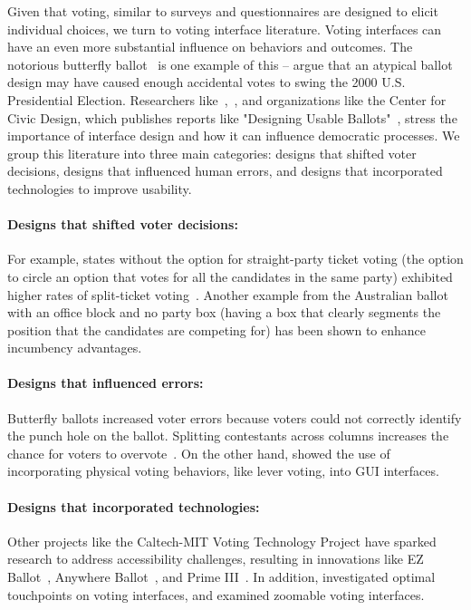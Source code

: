 Given that voting, similar to surveys and questionnaires are designed to elicit individual choices, we turn to voting interface literature. Voting interfaces can have an even more substantial influence on behaviors and outcomes. The notorious butterfly ballot~\cite{wandButterflyDidIt2001} is one example of this -- \textcite{wandButterflyDidIt2001} argue that an atypical ballot design may have caused enough accidental votes to swing the 2000 U.S. Presidential Election. Researchers like~\textcite{engstrom2020politics},~\textcite{chisnellDemocracyDesignProblem2016}, and organizations like the Center for Civic Design, which publishes reports like "Designing Usable Ballots"~\cite{DesigningUsableBallots2015}, stress the importance of interface design and how it can influence democratic processes. We group this literature into three main categories: designs that shifted voter decisions, designs that influenced human errors, and designs that incorporated technologies to improve usability.

\paragraph{Designs that shifted voter decisions: } For example, states without the option for straight-party ticket voting (the option to circle an option that votes for all the candidates in the same party) exhibited higher rates of split-ticket voting~\cite{engstrom2020politics}. Another example from the Australian ballot with an office block and no party box (having a box that clearly segments the position that the candidates are competing for) has been shown to enhance incumbency advantages.
\paragraph{Designs that influenced errors: } Butterfly ballots increased voter errors because voters could not correctly identify the punch hole on the ballot. Splitting contestants across columns increases the chance for voters to overvote~\cite{quesenberyOpinionGoodDesign2020}. On the other hand, \textcite{everettElectronicVotingMachines2008} showed the use of incorporating physical voting behaviors, like lever voting, into GUI interfaces.
\paragraph{Designs that incorporated technologies: } Other projects like the Caltech-MIT Voting Technology Project have sparked research to address accessibility challenges, resulting in innovations like EZ Ballot~\cite{leeUniversalDesignBallot2016}, Anywhere Ballot~\cite{summers2014making}, and Prime III~\cite{dawkinsPrimeIIIInnovative2009}. In addition, \textcite{gilbertAnomalyDetectionElectronic2013} investigated optimal touchpoints on voting interfaces, and \textcite{conradElectronicVotingEliminates2009} examined zoomable voting interfaces.

